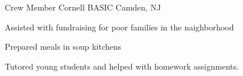 

\begin{cventries}

  \cventry
    {Crew Member} %
    {Cornell BASIC} %
    {Camden, NJ} %
    {} %
    {
      \begin{cvitems} %
      \item {Assisted with fundraising for poor families in the naighborhood}
      \item {Prepared meals in soup kitchens}
      \item {Tutored young students and helped with homework assignments.}
      \end{cvitems}
    }


\end{cventries}
